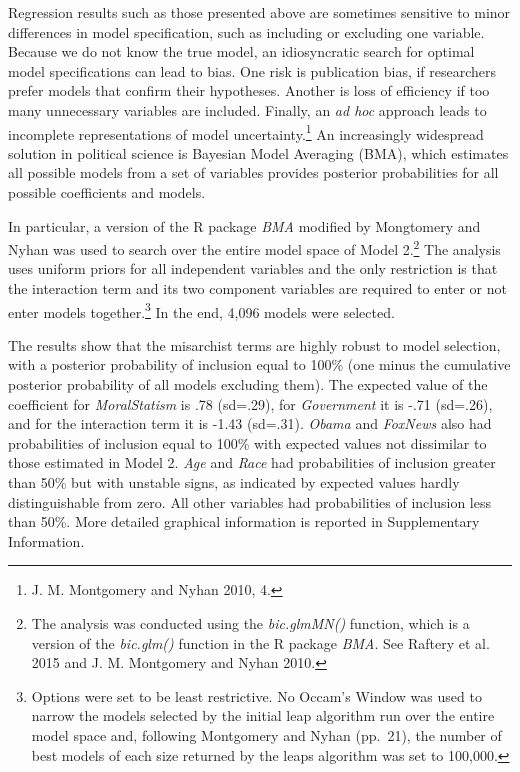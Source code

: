 \documentclass[12pt,]{article}
\begin{document}
Regression results such as those presented above are sometimes sensitive
to minor differences in model specification, such as including or
excluding one variable. Because we do not know the true model, an
idiosyncratic search for optimal model specifications can lead to bias.
One risk is publication bias, if researchers prefer models that confirm
their hypotheses. Another is loss of efficiency if too many unnecessary
variables are included. Finally, an \emph{ad hoc} approach leads to
incomplete representations of model uncertainty.\footnote{J. M.
  Montgomery and Nyhan 2010, 4. } An increasingly widespread solution in
political science is Bayesian Model Averaging (BMA), which estimates all
possible models from a set of variables provides posterior probabilities
for all possible coefficients and models.

In particular, a version of the R package \emph{BMA} modified by
Mongtomery and Nyhan was used to search over the entire model space of
Model 2.\footnote{The analysis was conducted using the
  \emph{bic.glmMN()} function, which is a version of the
  \emph{bic.glm()} function in the R package \emph{BMA}. See Raftery et
  al. 2015 and J. M. Montgomery and Nyhan 2010.} The analysis uses
uniform priors for all independent variables and the only restriction is
that the interaction term and its two component variables are required
to enter or not enter models together.\footnote{Options were set to be
  least restrictive. No Occam's Window was used to narrow the models
  selected by the initial leap algorithm run over the entire model space
  and, following Montgomery and Nyhan (pp.~21), the number of best
  models of each size returned by the leaps algorithm was set to
  100,000.} In the end, 4,096 models were selected.

The results show that the misarchist terms are highly robust to model
selection, with a posterior probability of inclusion equal to 100\% (one
minus the cumulative posterior probability of all models excluding
them). The expected value of the coefficient for \emph{MoralStatism} is
.78 (sd=.29), for \emph{Government} it is -.71 (sd=.26), and for the
interaction term it is -1.43 (sd=.31). \emph{Obama} and \emph{FoxNews}
also had probabilities of inclusion equal to 100\% with expected values
not dissimilar to those estimated in Model 2. \emph{Age} and \emph{Race}
had probabilities of inclusion greater than 50\% but with unstable
signs, as indicated by expected values hardly distinguishable from zero.
All other variables had probabilities of inclusion less than 50\%. More
detailed graphical information is reported in Supplementary Information.
\end{document}
